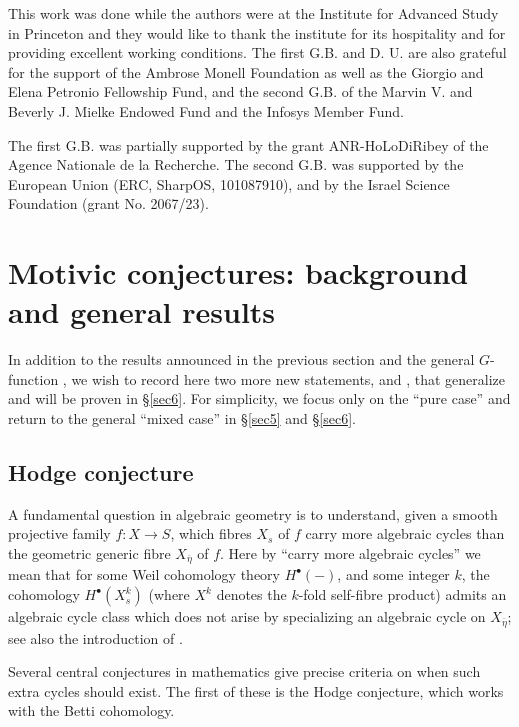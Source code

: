 \documentclass[10pt]{article}
\numberwithin{equation}{section}
\theoremstyle{plain}
\theoremstyle{definition}
\theoremstyle{remark}
\begin{document}
This work was done while the authors were at the Institute for Advanced Study in Princeton and they would like to thank the institute for its hospitality and for providing excellent working conditions. The first G.B. and D. U. are also grateful for the support of the Ambrose Monell Foundation as well as the Giorgio and Elena Petronio Fellowship Fund, and the second G.B. of the Marvin V. and Beverly J. Mielke Endowed Fund and the Infosys Member Fund.

The first G.B. was partially supported by the grant ANR-HoLoDiRibey of the Agence Nationale de la Recherche. The second G.B.
was supported by the European Union (ERC, SharpOS, 101087910), and by the Israel Science Foundation (grant No. 2067/23).


\section{Motivic conjectures: background and general results}\label{section2}

In addition to the results announced in the previous section and the general $G$-function , we wish to record here two more new statements,  and , that generalize  and will be proven in \S \ref{sec6}. For simplicity, we focus only on the ``pure case'' and return to the general ``mixed case'' in \S \ref{sec5} and \S \ref{sec6}.


\subsection{Hodge conjecture}

A fundamental question in algebraic geometry is to understand, given a smooth projective family $f : X \to S$, which fibres $X_{s}$ of $f$ carry more algebraic cycles than the geometric generic fibre $X_{\overline{\eta}}$ of $f$. Here by ``carry more algebraic cycles'' we mean that for some Weil cohomology theory $H^{\bullet}(-)$, and some integer $k$, the cohomology $H^{\bullet}(X^{k}_{s})$ (where $X^{k}$ denotes the $k$-fold self-fibre product) admits an algebraic cycle class which does not arise by specializing an algebraic cycle on $X_{\overline{\eta}}$; see also the introduction of \cite{2021arXiv210708838B}.

Several central conjectures in mathematics give precise criteria on when such extra cycles should exist. The first of these is the Hodge conjecture, which works with the Betti cohomology.
\end{document}

